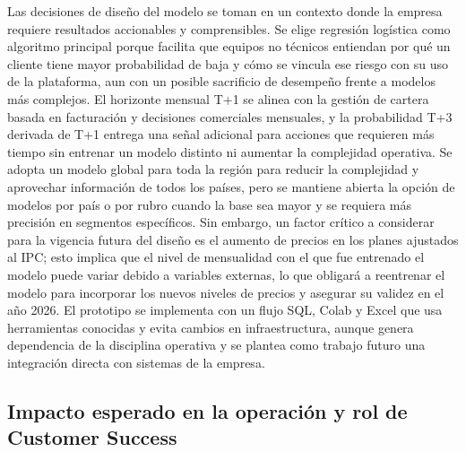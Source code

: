 Las decisiones de diseño del modelo se toman en un contexto donde la empresa requiere resultados accionables y comprensibles. Se elige regresión logística como algoritmo principal porque facilita que equipos no técnicos entiendan por qué un cliente tiene mayor probabilidad de baja y cómo se vincula ese riesgo con su uso de la plataforma, aun con un posible sacrificio de desempeño frente a modelos más complejos. El horizonte mensual T+1 se alinea con la gestión de cartera basada en facturación y decisiones comerciales mensuales, y la probabilidad T+3 derivada de T+1 entrega una señal adicional para acciones que requieren más tiempo sin entrenar un modelo distinto ni aumentar la complejidad operativa. Se adopta un modelo global para toda la región para reducir la complejidad y aprovechar información de todos los países, pero se mantiene abierta la opción de modelos por país o por rubro cuando la base sea mayor y se requiera más precisión en segmentos específicos. Sin embargo, un factor crítico a considerar para la vigencia futura del diseño es el aumento de precios en los planes ajustados al IPC; esto implica que el nivel de mensualidad con el que fue entrenado el modelo puede variar debido a variables externas, lo que obligará a reentrenar el modelo para incorporar los nuevos niveles de precios y asegurar su validez en el año 2026. El prototipo se implementa con un flujo SQL, Colab y Excel que usa herramientas conocidas y evita cambios en infraestructura, aunque genera dependencia de la disciplina operativa y se plantea como trabajo futuro una integración directa con sistemas de la empresa.

\subsection{Impacto esperado en la operación y rol de Customer Success}


